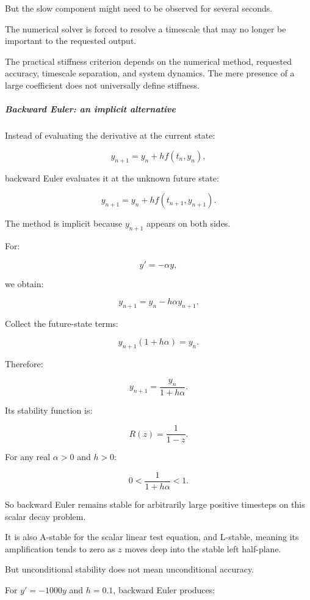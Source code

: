 But the slow component might need to be observed for several seconds.

The numerical solver is forced to resolve a timescale that may no longer be important to the requested output.

The practical stiffness criterion depends on the numerical method, requested accuracy, timescale separation, and system dynamics. The mere presence of a large coefficient does not universally define stiffness.

\subparagraph{Backward Euler: an implicit alternative}\label{02-foundations-ii-ch025-backward-euler-an-implicit-alternative}

\hypertarget{02-foundations-ii-ch025-backward-euler-an-implicit-alternative}{}

Instead of evaluating the derivative at the current state:

\[
y_{n+1}=y_n+hf(t_n,y_n),
\]

backward Euler evaluates it at the unknown future state:

\[
\boxed{ y_{n+1}=y_n+hf(t_{n+1},y_{n+1}) }.
\]

The method is implicit because \(y_{n+1}\) appears on both sides.

For:

\[
y'=-\alpha y,
\]

we obtain:

\[
y_{n+1}=y_n-h\alpha y_{n+1}.
\]

Collect the future-state terms:

\[
y_{n+1}(1+h\alpha)=y_n.
\]

Therefore:

\[
\boxed{ y_{n+1}=\frac{y_n}{1+h\alpha} }.
\]

Its stability function is:

\[
R(z)=\frac1{1-z}.
\]

For any real \(\alpha>0\) and \(h>0\):

\[
0<\frac1{1+h\alpha}<1.
\]

So backward Euler remains stable for arbitrarily large positive timesteps on this scalar decay problem.

It is also A-stable for the scalar linear test equation, and L-stable, meaning its amplification tends to zero as \(z\) moves deep into the stable left half-plane.

But unconditional stability does not mean unconditional accuracy.

For \(y'=-1000y\) and \(h=0.1\), backward Euler produces:

